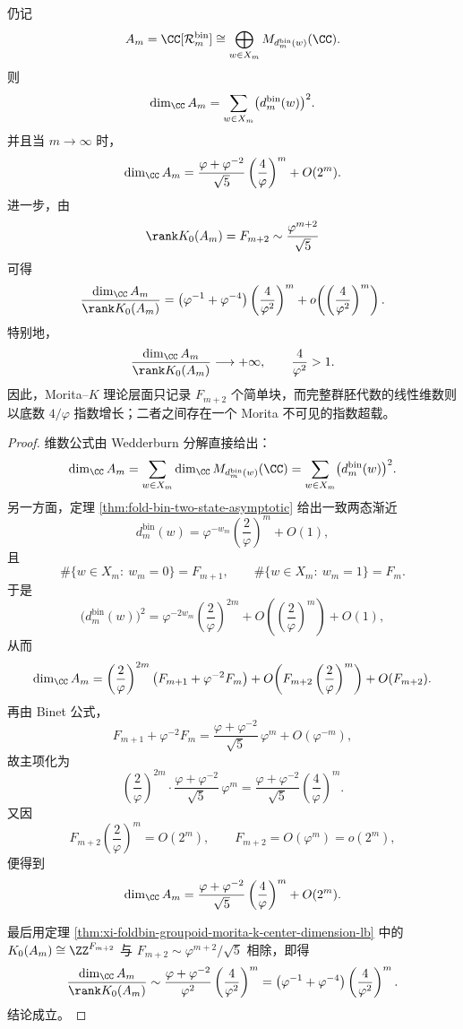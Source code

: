 \begin{theorem}\label{thm:xi-time-part60acb-groupoid-dimension-overload}
仍记
\[
A_m=\CC[\mathcal R_m^{\mathrm{bin}}]
\cong
\bigoplus_{w\in X_m}M_{d_m^{\mathrm{bin}}(w)}(\CC).
\]
则
\[
\dim_{\CC}A_m=\sum_{w\in X_m}\bigl(d_m^{\mathrm{bin}}(w)\bigr)^2.
\]
并且当 \(m\to\infty\) 时，
\[
\dim_{\CC}A_m
=
\frac{\varphi+\varphi^{-2}}{\sqrt5}
\left(\frac{4}{\varphi}\right)^m
+O(2^m).
\]
进一步，由
\[
\rank K_0(A_m)=F_{m+2}\sim \frac{\varphi^{m+2}}{\sqrt5}
\]
可得
\[
\frac{\dim_{\CC}A_m}{\rank K_0(A_m)}
=
\bigl(\varphi^{-1}+\varphi^{-4}\bigr)
\left(\frac{4}{\varphi^2}\right)^m
+o\!\left(\left(\frac{4}{\varphi^2}\right)^m\right).
\]
特别地，
\[
\frac{\dim_{\CC}A_m}{\rank K_0(A_m)}\longrightarrow +\infty,
\qquad
\frac{4}{\varphi^2}>1.
\]
因此，Morita--\(K\) 理论层面只记录 \(F_{m+2}\) 个简单块，而完整群胚代数的线性维数则以底数 \(4/\varphi\) 指数增长；二者之间存在一个 Morita 不可见的指数超载。
\end{theorem}
\begin{proof}
维数公式由 Wedderburn 分解直接给出：
\[
\dim_{\CC}A_m
=
\sum_{w\in X_m}\dim_{\CC}M_{d_m^{\mathrm{bin}}(w)}(\CC)
=
\sum_{w\in X_m}\bigl(d_m^{\mathrm{bin}}(w)\bigr)^2.
\]
另一方面，定理 \ref{thm:fold-bin-two-state-asymptotic} 给出一致两态渐近
\[
d_m^{\mathrm{bin}}(w)=\varphi^{-w_m}\left(\frac{2}{\varphi}\right)^m+O(1),
\]
且
\[
\#\{w\in X_m:\ w_m=0\}=F_{m+1},
\qquad
\#\{w\in X_m:\ w_m=1\}=F_m.
\]
于是
\[
\bigl(d_m^{\mathrm{bin}}(w)\bigr)^2
=
\varphi^{-2w_m}\left(\frac{2}{\varphi}\right)^{2m}
+O\!\left(\left(\frac{2}{\varphi}\right)^m\right)+O(1),
\]
从而
\[
\dim_{\CC}A_m
=
\left(\frac{2}{\varphi}\right)^{2m}
\bigl(F_{m+1}+\varphi^{-2}F_m\bigr)
+O\!\left(F_{m+2}\left(\frac{2}{\varphi}\right)^m\right)
+O(F_{m+2}).
\]
再由 Binet 公式，
\[
F_{m+1}+\varphi^{-2}F_m
=
\frac{\varphi+\varphi^{-2}}{\sqrt5}\,\varphi^m+O(\varphi^{-m}),
\]
故主项化为
\[
\left(\frac{2}{\varphi}\right)^{2m}
\cdot
\frac{\varphi+\varphi^{-2}}{\sqrt5}\,\varphi^m
=
\frac{\varphi+\varphi^{-2}}{\sqrt5}\left(\frac{4}{\varphi}\right)^m.
\]
又因
\[
F_{m+2}\left(\frac{2}{\varphi}\right)^m=O(2^m),
\qquad
F_{m+2}=O(\varphi^m)=o(2^m),
\]
便得到
\[
\dim_{\CC}A_m
=
\frac{\varphi+\varphi^{-2}}{\sqrt5}\left(\frac{4}{\varphi}\right)^m+O(2^m).
\]

最后用定理 \ref{thm:xi-foldbin-groupoid-morita-k-center-dimension-lb} 中的
\(
K_0(A_m)\cong \ZZ^{F_{m+2}}
\)
与
\(
F_{m+2}\sim \varphi^{m+2}/\sqrt5
\)
相除，即得
\[
\frac{\dim_{\CC}A_m}{\rank K_0(A_m)}
\sim
\frac{\varphi+\varphi^{-2}}{\varphi^2}
\left(\frac{4}{\varphi^2}\right)^m
=
\bigl(\varphi^{-1}+\varphi^{-4}\bigr)
\left(\frac{4}{\varphi^2}\right)^m.
\]
结论成立。
\end{proof}

